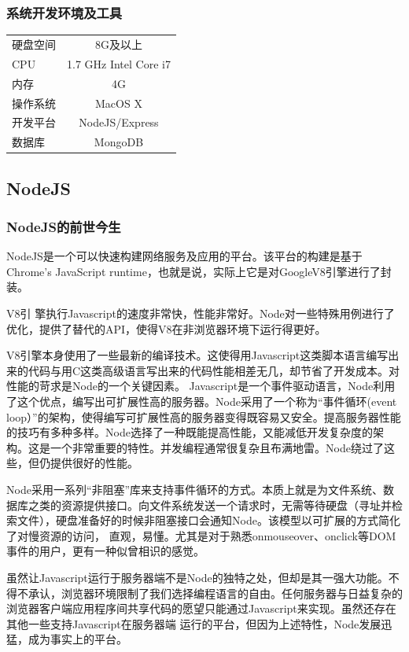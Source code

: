 \subsubsection{系统开发环境及工具}
\begin{tabular}{ l c }
  硬盘空间 & 8G及以上 \\
  CPU & 1.7 GHz Intel Core i7 \\
  内存 & 4G \\
  操作系统 & MacOS X \\
  开发平台 & NodeJS/Express \\
  数据库 & MongoDB \\
\end{tabular}

\subsection{NodeJS}

\subsubsection{NodeJS的前世今生}
\indent
NodeJS是一个可以快速构建网络服务及应用的平台。该平台的构建是基于Chrome's JavaScript runtime，也就是说，实际上它是对GoogleV8引擎进行了封装。

V8引 擎执行Javascript的速度非常快，性能非常好。Node对一些特殊用例进行了优化，提供了替代的API，使得V8在非浏览器环境下运行得更好。

V8引擎本身使用了一些最新的编译技术。这使得用Javascript这类脚本语言编写出来的代码与用C这类高级语言写出来的代码性能相差无几，却节省了开发成本。对性能的苛求是Node的一个关键因素。 Javascript是一个事件驱动语言，Node利用了这个优点，编写出可扩展性高的服务器。Node采用了一个称为“事件循环(event loop）”的架构，使得编写可扩展性高的服务器变得既容易又安全。提高服务器性能的技巧有多种多样。Node选择了一种既能提高性能，又能减低开发复杂度的架构。这是一个非常重要的特性。并发编程通常很复杂且布满地雷。Node绕过了这些，但仍提供很好的性能。

Node采用一系列“非阻塞”库来支持事件循环的方式。本质上就是为文件系统、数据库之类的资源提供接口。向文件系统发送一个请求时，无需等待硬盘（寻址并检索文件），硬盘准备好的时候非阻塞接口会通知Node。该模型以可扩展的方式简化了对慢资源的访问， 直观，易懂。尤其是对于熟悉onmouseover、onclick等DOM事件的用户，更有一种似曾相识的感觉。

虽然让Javascript运行于服务器端不是Node的独特之处，但却是其一强大功能。不得不承认，浏览器环境限制了我们选择编程语言的自由。任何服务器与日益复杂的浏览器客户端应用程序间共享代码的愿望只能通过Javascript来实现。虽然还存在其他一些支持Javascript在服务器端 运行的平台，但因为上述特性，Node发展迅猛，成为事实上的平台。

